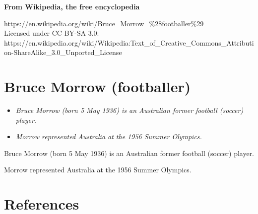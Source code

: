 \textbf{From Wikipedia, the free encyclopedia}

https://en.wikipedia.org/wiki/Bruce\_Morrow\_\%28footballer\%29\\
Licensed under CC BY-SA 3.0:\\
https://en.wikipedia.org/wiki/Wikipedia:Text\_of\_Creative\_Commons\_Attribution-ShareAlike\_3.0\_Unported\_License

\section{Bruce Morrow (footballer)}\label{bruce-morrow-footballer}

\begin{itemize}
\item
  \emph{Bruce Morrow (born 5 May 1936) is an Australian former football
  (soccer) player.}
\item
  \emph{Morrow represented Australia at the 1956 Summer Olympics.}
\end{itemize}

Bruce Morrow (born 5 May 1936) is an Australian former football (soccer)
player.

Morrow represented Australia at the 1956 Summer Olympics.

\section{References}\label{references}
